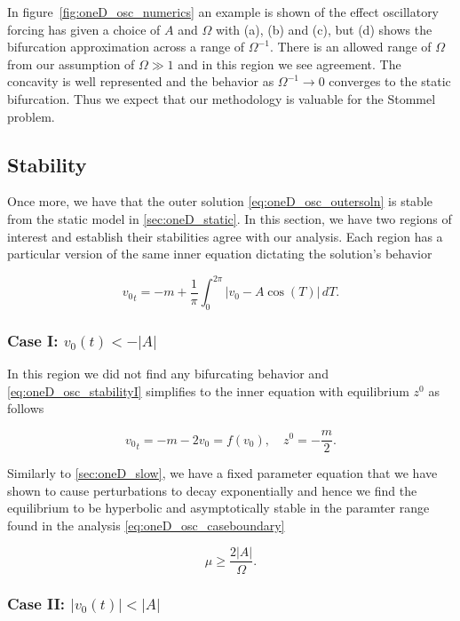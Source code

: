In figure~\ref{fig:oneD_osc_numerics} an example is shown of the effect oscillatory forcing has given a choice of $A$ and $\Omega$ with (a), (b) and (c), but (d) shows the bifurcation approximation across a range of $\Omega^{-1}$. There is an allowed range of $\Omega$ from our assumption of $\Omega \gg 1$ and in this region we see agreement. The concavity is well represented and the behavior as $\Omega^{-1}\to 0$ converges to the static bifurcation. Thus we expect that our methodology is valuable for the Stommel problem.

\subsection{Stability}

Once more, we have that the outer solution \eqref{eq:oneD_osc_outersoln} is stable from the static model in \autoref{sec:oneD_static}. In this section, we have two regions of interest and establish their stabilities agree with our analysis. Each region has a particular version of the same inner equation dictating the solution's behavior

\begin{equation}\label{eq:oneD_osc_stabilityI}
{v_0}_t=-m+\frac{1}{\pi}\int_0^{2\pi}|v_0-A\cos(T)|\,dT.
\end{equation}

\subsubsection{Case I: $v_0(t)< -|A|$}

In this region we did not find any bifurcating behavior and \eqref{eq:oneD_osc_stabilityI} simplifies to the inner equation with equilibrium $z^0$ as follows

\begin{equation*}
{v_0}_t=-m-2v_0=f(v_0), \quad z^0=-\frac{m}{2}.
\end{equation*}

Similarly to \autoref{sec:oneD_slow}, we have a fixed parameter equation that we have shown to cause perturbations to decay exponentially and hence we find the equilibrium to be hyperbolic and asymptotically stable in the paramter range found in the analysis \eqref{eq:oneD_osc_caseboundary}

\begin{equation*}
\mu \ge \frac{2|A|}{\Omega}.
\end{equation*}

\subsubsection{Case II: $|v_0(t)|<|A|$}

